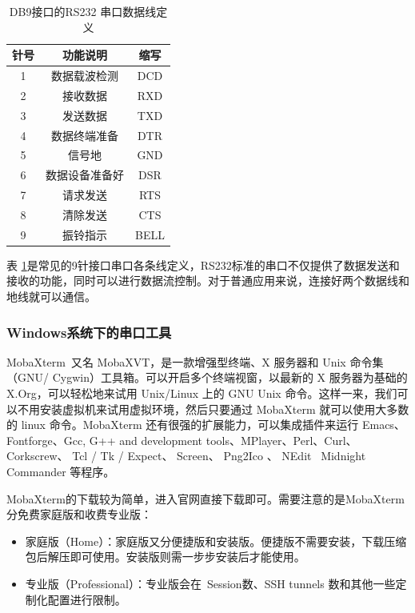 \begin{table}[!ht]
	\centering
	\begin{tabular}{|c|c|c|}
		\hline
		\textbf{针号} & \textbf{功能说明} & \textbf{缩写} \\
		\hline
		1 & 数据载波检测 & DCD  \\
		2 & 接收数据 & RXD  \\
		3 & 发送数据 & TXD \\
		4 & 数据终端准备 & DTR \\
		5 & 信号地 & GND \\
		6 & 数据设备准备好 & DSR \\
		7 & 请求发送 & RTS \\
		8 & 清除发送 & CTS \\
		9 & 振铃指示 & BELL \\
		\hline
	\end{tabular}
	\caption{DB9接口的RS232 串口数据线定义}
	\label{DB9接口的RS232 串口数据线定义}
\end{table}

表 \ref{DB9接口的RS232 串口数据线定义}是常见的9针接口串口各条线定义，RS232标准的串口不仅提供了数据发送和接收的功能，同时可以进行数据流控制。对于普通应用来说，连接好两个数据线和地线就可以通信。

\subsubsection{Windows系统下的串口工具}

MobaXterm 又名 MobaXVT，是一款增强型终端、X 服务器和 Unix 命令集（GNU/ Cygwin）工具箱。可以开启多个终端视窗，以最新的 X 服务器为基础的 X.Org，可以轻松地来试用 Unix/Linux 上的 GNU Unix 命令。这样一来，我们可以不用安装虚拟机来试用虚拟环境，然后只要通过 MobaXterm 就可以使用大多数的 linux 命令。MobaXterm 还有很强的扩展能力，可以集成插件来运行 Emacs、Fontforge、Gcc, G++ and development tools、MPlayer、Perl、Curl、Corkscrew、 Tcl / Tk / Expect、 Screen、 Png2Ico 、 NEdit  Midnight Commander 等程序。


MobaXterm的下载较为简单，进入官网直接下载即可。需要注意的是MobaXterm 分免费家庭版和收费专业版：
\begin{itemize}
	\item 家庭版（Home）：家庭版又分便捷版和安装版。便捷版不需要安装，下载压缩包后解压即可使用。安装版则需一步步安装后才能使用。
	\item 专业版（Professional）：专业版会在 Session数、SSH tunnels 数和其他一些定制化配置进行限制。
\end{itemize}

